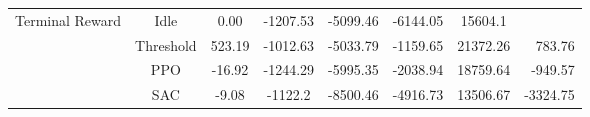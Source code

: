 \documentclass{article}
\begin{document}
\begin{table*}[t]
\begin{center}
\begin{small}
\begin{sc}
\begin{tabular}{lccccccr}
    \midrule
    \multirow{4}{*}{Terminal Reward} 
        & Idle      & 0.00   & -1207.53 & -5099.46  & -6144.05  & 15604.1 & \\
        & Threshold & 523.19 & -1012.63 & -5033.79 & -1159.65  & 21372.26 &783.76\\
        & PPO       & -16.92 & -1244.29 & -5995.35 & -2038.94  & 18759.64& -949.57\\
        & SAC       & -9.08  & -1122.2 & -8500.46 & -4916.73  & 13506.67 & -3324.75\\
    \bottomrule
    \end{tabular}
    \end{sc}
    \end{small}
    \end{center}
    \vskip -0.1in
    \end{table*}
    
\newpage
\end{document}
